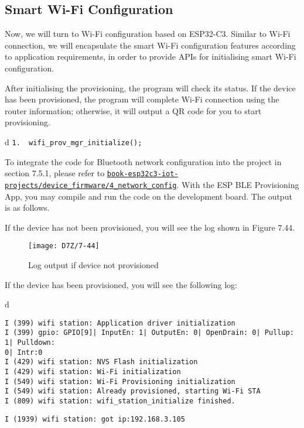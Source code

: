 \documentclass[a4paper,12pt]{book}
\begin{document}
\subsection{Smart Wi-Fi Configuration}
Now, we will turn to Wi-Fi configuration based on ESP32-C3. Similar to Wi-Fi connection, we will encapsulate the smart Wi-Fi configuration features according to application requirements, in order to provide APIs for initialising smart Wi-Fi configuration.

After initialising the provisioning, the program will check its status. If the device has been provisioned, the program will complete Wi-Fi connection using the router information; otherwise, it will output a QR code for you to start provisioning.

\begin{codebloc}
\begin{tabular}{d}
\verb|1.  wifi_prov_mgr_initialize();|
\end{tabular}
\end{codebloc}

To integrate the code for Bluetooth network configuration into the project in section 7.5.1, please refer to \href{https://github.com/espressif/book-esp32c3-iot-projects/tree/main/device_firmware/4_network_config}{\texttt{book-esp32c3-iot-projects/device\_firmware/4\_network\_config}}. With the ESP BLE Provisioning App, you may compile and run the code on the development board. The output is as follows.


If the device has not been provisioned, you will see the log shown in Figure 7.44.

\begin{figure}[!h]
    \centering
    \texttt{[image: D7Z/7-44]}
    \caption{Log output if device not provisioned}
\end{figure}

If the device has been provisioned, you will see the following log:

\begin{codebloc}
\fontsize{9.7pt}{9.7pt}\selectfont
\begin{tabular}{d}
\vspace{2pt}
\begin{verbatim}
I (399) wifi station: Application driver initialization   
I (399) gpio: GPIO[9]| InputEn: 1| OutputEn: 0| OpenDrain: 0| Pullup: 1| Pulldown: 
0| Intr:0 
I (429) wifi station: NVS Flash initialization   
I (429) wifi station: Wi-Fi initialization   
I (549) wifi station: Wi-Fi Provisioning initialization   
I (549) wifi station: Already provisioned, starting Wi-Fi STA   
I (809) wifi station: wifi_station_initialize finished.   
\end{verbatim}
\verb|I (1939) wifi station: got ip:192.168.3.105|
\end{tabular}
\end{codebloc}
\end{document}

